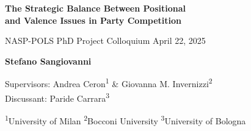 \documentclass[9pt, aspectratio=169]{beamer}
\begin{document}
\begin{frame}[plain]       
       

    \vspace{1.6cm} %
    \centering
    \LARGE\textbf{The Strategic Balance Between Positional \\ and Valence Issues in Party Competition}\par
    
    \vspace{0.6cm}
    {\large NASP-POLS PhD Project Colloquium}
    \vspace{0.2cm}
    {\small April 22, 2025}
    
    \vspace{0.6cm}
    \textbf{\large Stefano Sangiovanni}
    
    \vspace{0.6cm}
    \begin{minipage}{0.8\textwidth}
    \centering
    \small
    Supervisors: Andrea Ceron\textsuperscript{1} \& Giovanna M. Invernizzi\textsuperscript{2} \\
    Discussant: Paride Carrara\textsuperscript{3}
    \end{minipage}
    
    \vspace{0.6cm}
    \begin{minipage}{0.8\textwidth}
    \centering
    \footnotesize
    \textsuperscript{1}University of Milan \hspace{0.7cm} 
    \textsuperscript{2}Bocconi University \hspace{0.7cm} 
    \textsuperscript{3}University of Bologna
    \end{minipage}          
\end{frame}
\end{document}
